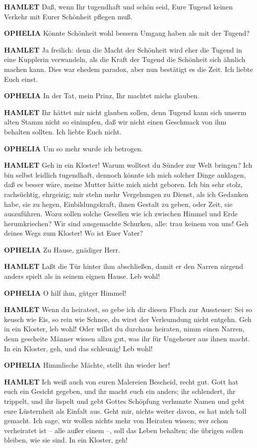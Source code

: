 \textbf{HAMLET}
Daß, wenn Ihr tugendhaft und schön seid, Eure Tugend keinen Verkehr mit Eurer
Schönheit pflegen muß.

\textbf{OPHELIA}
Könnte Schönheit wohl bessern Umgang haben als mit der Tugend?

\textbf{HAMLET}
Ja freilich: denn die Macht der Schönheit wird eher die Tugend in eine
Kupplerin verwandeln, als die Kraft der Tugend die Schönheit sich ähnlich
machen kann. Dies war ehedem paradox, aber nun bestätigt es die Zeit. Ich
liebte Euch einst.

\textbf{OPHELIA}
In der Tat, mein Prinz, Ihr machtet michs glauben.

\textbf{HAMLET}
Ihr hättet mir nicht glauben sollen, denn Tugend kann sich unserm alten Stamm
nicht so einimpfen, daß wir nicht einen Geschmack von ihm behalten sollten. Ich
liebte Euch nicht.

\textbf{OPHELIA}
Um so mehr wurde ich betrogen.

\textbf{HAMLET}
Geh in ein Kloster! Warum wolltest du Sünder zur Welt bringen? Ich bin selbst
leidlich tugendhaft, dennoch könnte ich mich solcher Dinge anklagen, daß es
besser wäre, meine Mutter hätte mich nicht geboren. Ich bin sehr stolz,
rachsüchtig, ehrgeizig; mir stehn mehr Vergehungen zu Dienst, als ich Gedanken
habe, sie zu hegen, Einbildungskraft, ihnen Gestalt zu geben, oder Zeit, sie
auszuführen. Wozu sollen solche Gesellen wie ich zwischen Himmel und Erde
herumkriechen? Wir sind ausgemachte Schurken, alle: trau keinem von uns! Geh
deines Wegs zum Kloster! Wo ist Euer Vater?

\textbf{OPHELIA}
Zu Hause, gnädiger Herr.

\textbf{HAMLET}
Laßt die Tür hinter ihm abschließen, damit er den Narren nirgend anders spielt
als in seinem eignen Hause. Leb wohl!

\textbf{OPHELIA}
O hilf ihm, gütger Himmel!

\textbf{HAMLET}
Wenn du heiratest, so gebe ich dir diesen Fluch zur Aussteuer: Sei so keusch
wie Eis, so rein wie Schnee, du wirst der Verleumdung nicht entgehn. Geh in ein
Kloster, leb wohl! Oder willst du durchaus heiraten, nimm einen Narren, denn
gescheite Männer wissen allzu gut, was ihr für Ungeheuer aus ihnen macht. In
ein Kloster, geh, und das schleunig! Leb wohl!

\textbf{OPHELIA}
Himmlische Mächte, stellt ihn wieder her!

\textbf{HAMLET}
Ich weiß auch von euren Malereien Bescheid, recht gut. Gott hat euch ein
Gesicht gegeben, und ihr macht euch ein anders; ihr schlendert, ihr trippelt,
und ihr lispelt und gebt Gottes Schöpfung verhunzte Namen und gebt eure
Lüsternheit als Einfalt aus. Geht mir, nichts weiter davon, es hat mich toll
gemacht. Ich sage, wir wollen nichts mehr von Heiraten wissen; wer schon
verheiratet ist -- alle außer einem --, soll das Leben behalten; die übrigen
sollen bleiben, wie sie sind. In ein Kloster, geh!
